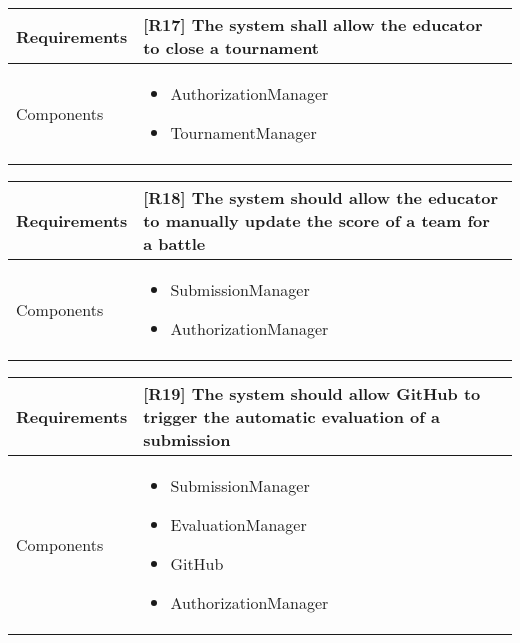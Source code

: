 \begin{tabular}{|p{3cm}|p{10cm}|}
    \hline
    Requirements & [R17] The system shall allow the educator to close a tournament \\
    \hline
    Components & 
    \begin{itemize}
        \item AuthorizationManager
        \item TournamentManager
    \end{itemize} 
    \\
    \hline
\end{tabular}

\begin{tabular}{|p{3cm}|p{10cm}|}
    \hline
    Requirements & [R18] The system should allow the educator to manually update the score of a team for a battle \\
    \hline
    Components & 
    \begin{itemize}
        \item SubmissionManager
        \item AuthorizationManager
    \end{itemize} 
    \\
    \hline
\end{tabular}

\begin{tabular}{|p{3cm}|p{10cm}|}
    \hline
    Requirements & [R19] The system should allow GitHub to trigger the automatic evaluation of a submission \\
    \hline
    Components & 
    \begin{itemize}
        \item SubmissionManager
        \item EvaluationManager
        \item GitHub
        \item AuthorizationManager
    \end{itemize} 
    \\
    \hline
\end{tabular}